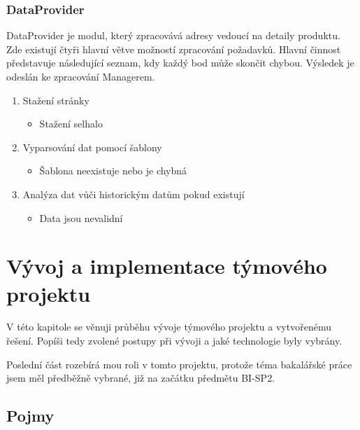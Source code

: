 \documentclass[thesis=B,czech]{FITthesis}[2012/06/26]
\begin{document}
\subsection{DataProvider}
DataProvider je modul, který zpracovává adresy vedoucí na detaily produktu. Zde existují čtyři hlavní větve možností zpracování požadavků.
Hlavní činnost představuje následující seznam, kdy každý bod může skončit chybou. Výsledek je odeslán ke zpracování Managerem.
\par
\begin{enumerate}
\item Stažení stránky
	\begin{itemize}
	\item Stažení selhalo
	\end{itemize}
\item Vyparsování dat pomocí šablony
	\begin{itemize}
	\item Šablona neexistuje nebo je chybná
	\end{itemize}
\item Analýza dat vůči historickým datům pokud existují
	\begin{itemize}
	\item Data jsou nevalidní
	\end{itemize}
\end{enumerate}



\chapter{Vývoj a implementace týmového projektu}
V této kapitole se věnuji průběhu vývoje týmového projektu a vytvořenému řešení. Popíši tedy zvolené postupy při vývoji a 
jaké technologie byly vybrány.
\par
Poslední část rozebírá mou roli v tomto
projektu, protože téma bakalářské práce jsem měl předběžně vybrané, již na začátku předmětu BI-SP2.


\section{Pojmy}
\end{document}
